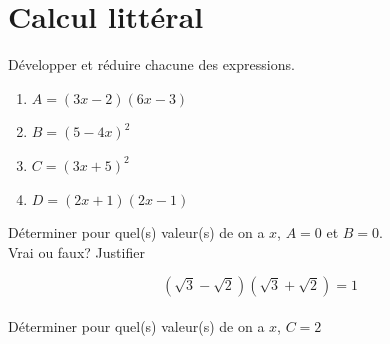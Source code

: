 \documentclass[french]{book}
\begin{document}
\section*{Calcul littéral}

Développer et réduire chacune des expressions.\\

\begin{enumerate}
\item[] $A=(3x-2)(6x-3)$
\item[]$B=(5-4x)^2$
\item[] $C=(3x+5)^2$
\item[] $D=(2x+1)(2x-1)$\\
\end{enumerate} 

Déterminer pour quel(s) valeur(s) de on a $x$, $A=0$ et $B=0$.\\


Vrai ou faux? Justifier

$$ (\sqrt{3}-\sqrt{2})(\sqrt{3}+\sqrt{2})=1$$\\

Déterminer pour quel(s) valeur(s) de on a $x$, $C=2$
\end{document}
